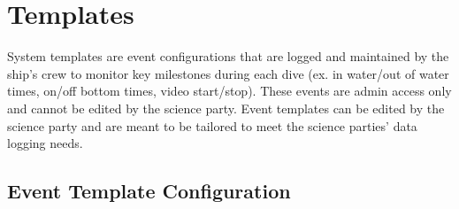 \documentclass[
  letterpaper,
  DIV=11,
  numbers=noendperiod]{scrreprt}
\begin{document}
\begin{figure}
\begin{minipage}[t]{0.50\linewidth}
{

}

\end{minipage}%

\end{figure}

\hypertarget{templates}{%
\section{Templates}\label{templates}}

System templates are event configurations that are logged and maintained
by the ship's crew to monitor key milestones during each dive (ex. in
water/out of water times, on/off bottom times, video start/stop). These
events are admin access only and cannot be edited by the science party.
Event templates can be edited by the science party and are meant to be
tailored to meet the science parties' data logging needs.

\hypertarget{event-template-configuration}{%
\subsection{Event Template
Configuration}\label{event-template-configuration}}
\end{document}
